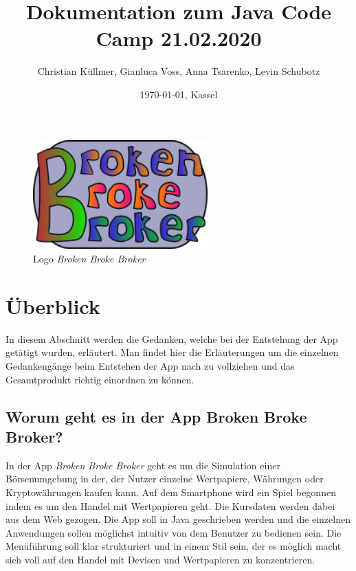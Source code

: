 \documentclass[10pt]{scrartcl}
\begin{document}
\title{Dokumentation zum Java Code Camp 21.02.2020}

\author{Christian Küllmer, Gianluca Voss, Anna Tsarenko, Levin Schubotz}
\date{\today{}, Kassel}
\maketitle
\begin{figure}[H]
	\centering
	\includegraphics[width=0.6\textwidth]{Bilder/Titelblatt/big_logo.png}
	\caption{Logo \textit{Broken Broke Broker}}
\end{figure}
\newpage
\renewcommand{\contentsname}{Inhaltsverzeichnis}
\tableofcontents
\newpage

\section{Überblick}

In diesem Abschnitt werden die Gedanken, welche bei der Entstehung der App getätigt wurden, erläutert. Man findet hier die Erläuterungen um die einzelnen Gedankengänge beim Entstehen der App nach zu vollziehen und das Gesamtprodukt richtig einordnen zu können.

\subsection{Worum geht es in der App Broken Broke Broker?}
In der App \textit{Broken Broke Broker} geht es um die Simulation einer Börsenumgebung in der, der Nutzer einzelne Wertpapiere, Währungen oder Kryptowährungen kaufen kann. Auf dem Smartphone wird ein Spiel begonnen indem es um den Handel mit Wertpapieren geht. Die Kursdaten werden dabei aus dem Web gezogen. Die App soll in Java geschrieben werden und die einzelnen Anwendungen sollen möglichst intuitiv von dem Benutzer zu bedienen sein. Die Menüführung soll klar strukturiert und in einem Stil sein, der es möglich macht sich voll auf den Handel mit Devisen und Wertpapieren zu konzentrieren.
\end{document}
